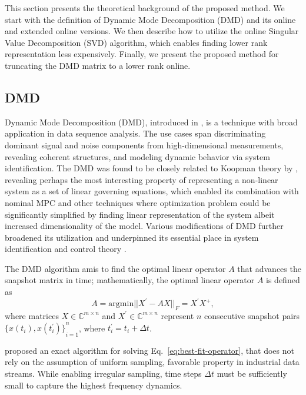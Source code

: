 This section presents the theoretical background of the proposed method. We start with the definition of Dynamic Mode Decomposition (DMD) and its online and extended online versions. We then describe how to utilize the online Singular Value Decomposition (SVD) algorithm, which enables finding lower rank representation less expensively. Finally, we present the proposed method for truncating the DMD matrix to a lower rank online.

\subsection{DMD}\label{sec:dmd}
Dynamic Mode Decomposition (DMD), introduced in \citet{Schmid2010}, is a technique with broad application in data sequence analysis. The use cases span discriminating dominant signal and noise components from high-dimensional measurements, revealing coherent structures, and modeling dynamic behavior via system identification. The DMD was found to be closely related to Koopman theory by \citet{Rowley2009}, revealing perhaps the most interesting property of representing a non-linear system as a set of linear governing equations, which enabled its combination with nominal MPC and other techniques where optimization problem could be significantly simplified by finding linear representation of the system albeit increased dimensionality of the model. Various modifications of DMD further broadened its utilization and underpinned its essential place in system identification and control theory \citep{Schmid2022}.

The DMD algorithm amis to find the optimal linear operator \(A\) that advances the snapshot matrix in time; mathematically, the optimal linear operator \(A\) is defined as
\begin{equation}\label{eq:best-fit-operator}
    A = \mathrm{argmin} ||X^\prime - AX||_F = X^\prime X^+,
\end{equation}
where matrices \(X \in \mathbb{C}^{m \times n}\) and \(X^\prime \in \mathbb{C}^{m \times n}\) represent \(n\) consecutive snapshot pairs \({\{x(t_i), x(t_i^\prime )\}}^n_{i=1}\), where \(t_i^\prime = t_i + \Delta t\).

\citet{Tu2013} proposed an exact algorithm for solving Eq.~\ref{eq:best-fit-operator}, that does not rely on the assumption of uniform sampling, favorable property in industrial data streams. While enabling irregular sampling, time steps \(\Delta t\) must be sufficiently small to capture the highest frequency dynamics.

